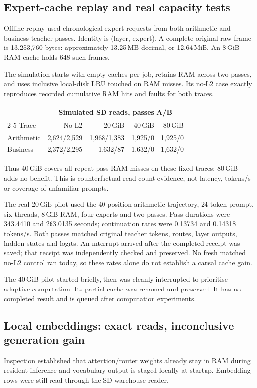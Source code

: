 \subsection{Expert-cache replay and real capacity tests}
Offline replay used chronological expert requests from both arithmetic and
business teacher passes. Identity is (layer, expert). A complete original
raw frame is 13,253,760 bytes: approximately 13.25\,MB decimal, or
12.64\,MiB. An 8\,GiB RAM cache holds 648 such frames.

The simulation starts with empty caches per job, retains RAM across two
passes, and uses inclusive local-disk LRU touched on RAM misses. Its no-L2
case exactly reproduces recorded cumulative RAM hits and faults for both
traces.
\begin{center}
\begin{tabular}{lrrrr}
\toprule
& \multicolumn{4}{c}{Simulated SD reads, passes A/B} \\
\cmidrule(lr){2-5}
Trace & No L2 & 20\,GiB & 40\,GiB & 80\,GiB \\
\midrule
Arithmetic & 2,624/2,529 & 1,968/1,383 & 1,925/0 & 1,925/0 \\
Business & 2,372/2,295 & 1,632/87 & 1,632/0 & 1,632/0 \\
\bottomrule
\end{tabular}
\end{center}
Thus 40\,GiB covers all repeat-pass RAM misses on these fixed traces;
80\,GiB adds no benefit. This is counterfactual read-count evidence, not
latency, tokens/s or coverage of unfamiliar prompts.

The real 20\,GiB pilot used the 40-position arithmetic trajectory,
24-token prompt, six threads, 8\,GiB RAM, four experts and two passes.
Pass durations were 343.4410 and 263.0135 seconds; continuation rates were
0.13734 and 0.14318 tokens/s. Both passes matched original teacher tokens,
routes, layer outputs, hidden states and logits. An interrupt arrived after
the completed receipt was saved; that receipt was independently checked
and preserved. No fresh matched no-L2 control ran today, so these rates
alone do not establish a causal cache gain.

The 40\,GiB pilot started briefly, then was cleanly interrupted to prioritise
adaptive computation. Its partial cache was renamed and preserved. It has
no completed result and is queued after computation experiments.

\subsection{Local embeddings: exact reads, inconclusive generation gain}
Inspection established that attention/router weights already stay in RAM
during resident inference and vocabulary output is staged locally at
startup. Embedding rows were still read through the SD warehouse reader.

